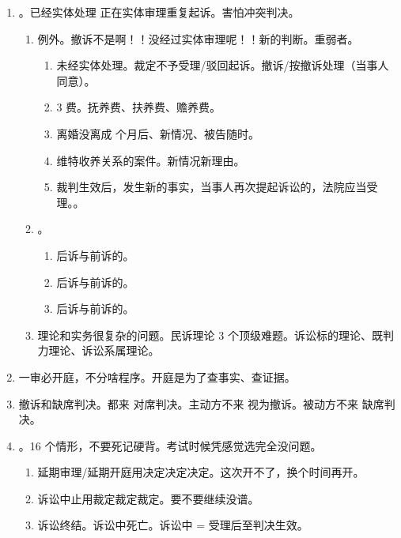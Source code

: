 \begin{enumerate}
  \item {}。已经实体处理 \hz 正在实体审理重复起诉。害怕冲突判决。
        \begin{enumerate}
          \item 例外。撤诉不是啊！！没经过实体审理呢！！新的判断。重弱者。
                \begin{enumerate}
                  \item 未经实体处理。裁定不予受理/驳回起诉。撤诉/按撤诉处理（当事人同意）。
                  \item 3 费。抚养费、扶养费、赡养费。
                  \item 离婚没离成  个月后、新情况、被告随时。
                  \item 维特收养关系的案件。新情况新理由。
                  \item 裁判生效后，发生新的事实，当事人再次提起诉讼的，法院应当受理。。
                \end{enumerate}
          \item {}。
                \begin{enumerate}
                  \item 后诉与前诉的。
                  \item 后诉与前诉的。
                  \item 后诉与前诉的。
                \end{enumerate}
          \item 理论和实务很复杂的问题。民诉理论 3 个顶级难题。诉讼标的理论、既判力理论、诉讼系属理论。
        \end{enumerate}
  \item 一审必开庭，不分啥程序。开庭是为了查事实、查证据。
  \item 撤诉和缺席判决。都来 \yjt 对席判决。主动方不来 \yjt 视为撤诉。被动方不来 \yjt 缺席判决。
  \item {}。16 个情形，不要死记硬背。考试时候凭感觉选完全没问题。
        \begin{enumerate}
          \item 延期审理/延期开庭用决定决定决定。这次开不了，换个时间再开。
          \item 诉讼中止用裁定裁定裁定。要不要继续没谱。
          \item 诉讼终结。诉讼中死亡。诉讼中 = 受理后至判决生效。
                \begin{enumerate}

\end{enumerate}
\end{enumerate}
\end{enumerate}
